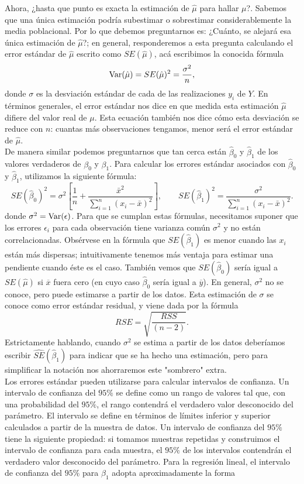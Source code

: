 Ahora, ¿hasta que punto es exacta la estimación de $\hat{\mu}$ para hallar $\mu$?. Sabemos que una única estimación podría subestimar o sobrestimar considerablemente la media poblacional. Por lo que debemos preguntarnos es: ¿Cuánto, se alejará esa única estimación de $\hat{\mu}$?; en general, responderemos a esta pregunta calculando el error estándar de $\hat{\mu}$ escrito como $SE(\hat{\mu})$, acá escribimos la conocida fórmula
$$\mathop{\mbox{\normalfont Var}}\nolimits(\hat{\mu})=SE(\hat{\mu})^2=\dfrac{\sigma^2}{n},$$
donde $\sigma$ es la desviación estándar de cada de las realizaciones $y_i$ de $Y$. En términos generales, el error estándar nos dice en que medida esta estimación $\hat{\mu}$ difiere del valor real de $\mu$. Esta ecuación también nos dice cómo esta desviación se reduce con $n$: cuantas más observaciones tengamos, menor será el error estándar de $\hat{\mu}$.\\
De manera similar podemos preguntarnos que tan cerca están $\hat{\beta}_0$ y $\hat{\beta}_1$ de los valores verdaderos de $\beta_0$ y $\beta_1$. Para calcular los errores estándar asociados con $\hat{\beta}_0$ y $\hat{\beta}_1$, utilizamos la siguiente fórmula:
$$SE(\hat{\beta}_0)^2=\sigma^2\left[\dfrac{1}{n}+\dfrac{\bar{x}^2}{\sum_{i=1}^{n}\left(x_i-\bar{x}\right)^2}\right], \qquad SE(\hat{\beta}_1)^2=\dfrac{\sigma^2}{\sum_{i=1}^{n}\left(x_i-\bar{x}\right)^2}.$$
donde $\sigma^2=\mathop{\mbox{\normalfont Var}}\nolimits(\epsilon)$. Para que se cumplan estas fórmulas, necesitamos suponer que los errores $\epsilon_i$ para cada observación tiene varianza común $\sigma^2$ y no están correlacionadas. Obsérvese en la fórmula que $SE(\hat{\beta}_1)$ es menor cuando las $x_i$ están más dispersas; intuitivamente tenemos más ventaja para estimar una pendiente cuando éste es el caso. También vemos que $SE(\hat{\beta}_0)$ sería igual a $SE(\hat{\mu})$ si $\overline{x}$ fuera cero (en cuyo caso $\hat{\beta}_0$ sería igual a $\overline{y}$). En general, $\sigma^2$ no se conoce, pero puede estimarse a partir de los datos. Esta estimación de $\sigma$ se conoce como error estándar residual, y viene dada por la fórmula 
$$RSE=\sqrt{\dfrac{RSS}{(n-2)}}.$$ 
Estrictamente hablando, cuando $\sigma^2$ se estima a partir de los datos deberíamos escribir $\hat{SE}(\hat{\beta}_1)$ para indicar que se ha hecho una estimación, pero para simplificar la notación nos ahorraremos este "sombrero" extra. \\
Los errores estándar pueden utilizarse para calcular intervalos de confianza. Un intervalo de confianza del $95\%$ se define como un rango de valores tal que, con una probabilidad del $95\%$, el rango contendrá el verdadero valor desconocido del parámetro. El intervalo se define en términos de límites inferior y superior calculados a partir de la muestra de datos. Un intervalo de confianza del $95\%$ tiene la siguiente propiedad: si tomamos muestras repetidas y construimos el intervalo de confianza para cada muestra, el $95\%$ de los intervalos contendrán el verdadero valor desconocido del parámetro. Para la regresión lineal, el intervalo de confianza del $95\%$ para $\beta_1$ adopta aproximadamente la forma
